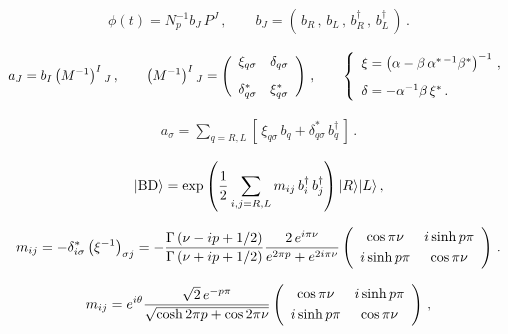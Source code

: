 \begin{eqnarray}
\phi(t)=N_p^{-1}b_J\,P^J\,,\qquad
b_J=\left(\,b_R\,,\,b_L\,,\,b_R^\dagger\,,\, b_L^\dagger\,\right)\,.
\label{phi3}
\end{eqnarray}


\begin{eqnarray}
a_J=b_I\left(M^{-1}\right)^I{}_J\,,\qquad
\left(M^{-1}\right)^I{}_J=\left(
\begin{array}{ll}
\xi_{q\sigma} & \delta_{q\sigma} \vspace{3mm}\\
\delta_{q\sigma}^* & \xi_{q\sigma}^* \\
\end{array}\right)\,,\qquad
\left\{
\begin{array}{l}
\xi=
\left(\alpha-\beta\,\alpha^{*\,-1}\beta^*\right)^{-1}\,,\vspace{3mm}\\
\delta=-\alpha^{-1}\beta\,\xi^*\,.
\end{array}
\right.
\label{xidelta1}
\end{eqnarray}


\begin{eqnarray}
a_\sigma=\sum_{q=R,L}\left[\,\xi_{q\sigma}\,b_q+\delta_{q\sigma}^*\,b_q^\dagger\,\right]\,.
\label{ab}
\end{eqnarray}


\begin{eqnarray}
|{\rm BD}\rangle = \exp\left(\frac{1}{2}\sum_{i,j=R,L}m_{ij}\,b_i^\dagger\, b_j^\dagger\right) |R\rangle|L\rangle\,,
\label{bogoliubov1}
\end{eqnarray}

\begin{eqnarray}
m_{ij}=-\delta_{i\sigma}^*\left(\xi^{-1}\right)_{\sigma j}
=-\frac{\Gamma\left(\nu-ip+1/2\right)}{\Gamma\left(\nu+ip+1/2\right)}
\frac{2\,e^{i\pi\nu}}{e^{2\pi p}+e^{2i\pi\nu}}
\left(
\begin{array}{cc}
\cos \pi\nu & i\sinh p\pi \vspace{1mm}\\
i\sinh p\pi & \cos \pi\nu \\
\end{array}
\right)\,.
\label{mij1}
\end{eqnarray}


\begin{eqnarray}
m_{ij}=e^{i\theta}\frac{\sqrt{2}\,e^{-p\pi}}{\sqrt{\cosh 2\pi p+\cos 2\pi\nu}}
\left(
\begin{array}{cc}
\cos \pi\nu & i\sinh p\pi \vspace{1mm}\\
i\sinh p\pi & \cos \pi\nu \\
\end{array}
\right)\,,
\label{mij2}
\end{eqnarray}



